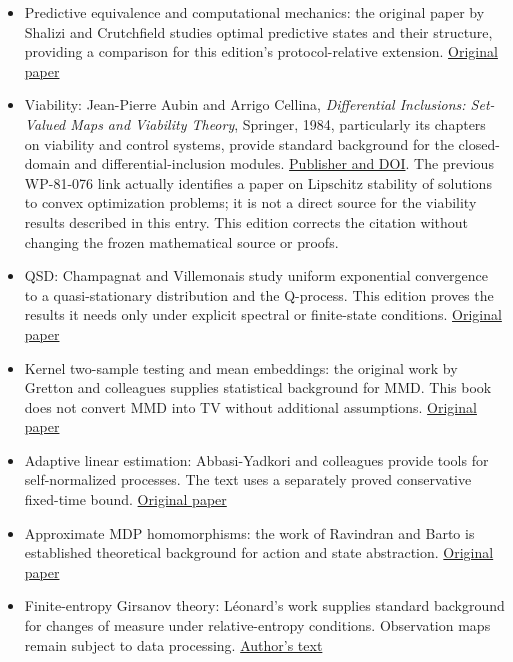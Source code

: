 \documentclass[
  english,
  11pt,
  oneside]{book}
\providecommand{\tightlist}{%
  \setlength{\itemsep}{0pt}\setlength{\parskip}{0pt}}
\begin{document}
\begin{itemize}
\tightlist
\item
  Predictive equivalence and computational mechanics: the original paper by Shalizi and Crutchfield studies optimal predictive states and their structure, providing a comparison for this edition's protocol-relative extension. \href{https://arxiv.org/abs/cond-mat/9907176}{Original paper}
\item
  Viability: Jean-Pierre Aubin and Arrigo Cellina, \emph{Differential Inclusions: Set-Valued Maps and Viability Theory}, Springer, 1984, particularly its chapters on viability and control systems, provide standard background for the closed-domain and differential-inclusion modules. \href{https://doi.org/10.1007/978-3-642-69512-4}{Publisher and DOI}. The previous WP-81-076 link actually identifies a paper on Lipschitz stability of solutions to convex optimization problems; it is not a direct source for the viability results described in this entry. This edition corrects the citation without changing the frozen mathematical source or proofs.
\item
  QSD: Champagnat and Villemonais study uniform exponential convergence to a quasi-stationary distribution and the Q-process. This edition proves the results it needs only under explicit spectral or finite-state conditions. \href{https://arxiv.org/abs/1404.1349}{Original paper}
\item
  Kernel two-sample testing and mean embeddings: the original work by Gretton and colleagues supplies statistical background for MMD. This book does not convert MMD into TV without additional assumptions. \href{https://www.jmlr.org/papers/volume13/gretton12a/gretton12a.pdf}{Original paper}
\item
  Adaptive linear estimation: Abbasi-Yadkori and colleagues provide tools for self-normalized processes. The text uses a separately proved conservative fixed-time bound. \href{https://arxiv.org/abs/1102.2670}{Original paper}
\item
  Approximate MDP homomorphisms: the work of Ravindran and Barto is established theoretical background for action and state abstraction. \href{https://all.cs.umass.edu/pubs/2004/ravindran_b_KBCS04.pdf}{Original paper}
\item
  Finite-entropy Girsanov theory: Léonard's work supplies standard background for changes of measure under relative-entropy conditions. Observation maps remain subject to data processing. \href{https://leonard.perso.math.cnrs.fr/papers/2012-Leonard-Girsanov\%20theory\%20under\%20a\%20finite\%20entropy\%20condition.pdf}{Author's text}
\end{itemize}
\end{document}
